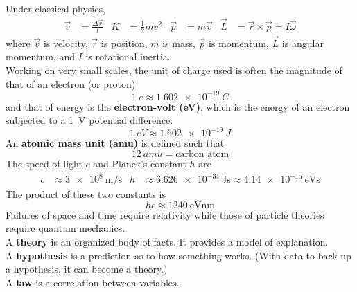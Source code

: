 \documentclass{subfiles}
\begin{document}
	Under classical physics,
		\begin{align*}
			\vec{v} &= \frac{\Delta\vec{r}}{t} &	
				K &= \frac{1}{2}mv^2 &
				\vec{p} &= m\vec{v} & 
				\vec{L} &= \vec{r} \times \vec{p}
					= I\vec{\omega}
		\end{align*}
		where \(\vec{v}\) is velocity, \(\vec{r}\) is position, \(m\) is mass, \(\vec{p}\) is momentum, \(\vec{L}\) is angular momentum, and \(I\) is rotational inertia. \\
	Working on very small scales, the unit of charge used is often the magnitude of that of an electron (or proton)
		\[\SI{1}{e} \approx \SI{1.602e-19}{C}\]
		and that of energy is the \textbf{electron-volt (eV)}, which is the energy of an electron subjected to a \SI{1}{V} potential difference:
		\[\SI{1}{eV} \approx \SI{1.602e-19}{J}\]
		An \textbf{atomic mass unit (amu)} is defined such that
		\[\SI{12}{amu} = \text{carbon atom}\]
		The speed of light \(c\) and Planck's constant \(h\) are
		\begin{align*}
			c &\approx \SI[per-mode = fraction]{3e8}{\m\per\s} &
				h &\approx \SI{6.626e-34}{\J\s}
					\approx \SI{4.14e-15}{\eV\s}
		\end{align*}
		The product of these two constants is
		\[hc \approx \SI{1240}{\eV\nm}\]
	Failures of space and time require relativity while those of particle theories require quantum mechanics. \\
	A \textbf{theory} is an organized body of facts. It provides a model of explanation. \\
	A \textbf{hypothesis} is a prediction as to how something works. (With data to back up a hypothesis, it can become a theory.) \\
	A \textbf{law} is a correlation between variables.
\end{document}
